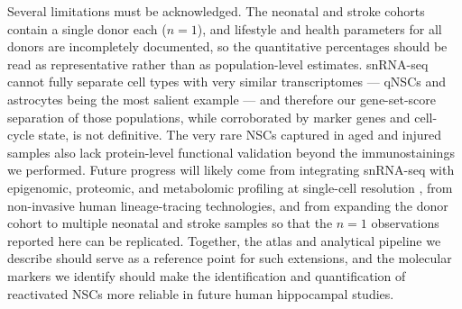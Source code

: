 \documentclass[11pt]{article}
\begin{document}
Several limitations must be acknowledged. The neonatal and stroke cohorts
contain a single donor each ($n=1$), and lifestyle and health parameters
for all donors are incompletely documented, so the quantitative
percentages should be read as representative rather than as
population-level estimates. snRNA-seq cannot fully separate cell types
with very similar transcriptomes --- qNSCs and astrocytes being the most
salient example --- and therefore our gene-set-score separation of those
populations, while corroborated by marker genes and cell-cycle state,
is not definitive. The very rare NSCs captured in aged and injured
samples also lack protein-level functional validation beyond the
immunostainings we performed. Future progress will likely come from
integrating snRNA-seq with epigenomic, proteomic, and metabolomic
profiling at single-cell resolution \cite{ayhan2021resolving,habib2017massively},
from non-invasive human lineage-tracing technologies, and from expanding
the donor cohort to multiple neonatal and stroke samples so that the
$n=1$ observations reported here can be replicated. Together, the atlas
and analytical pipeline we describe should serve as a reference point
for such extensions, and the molecular markers we identify should make
the identification and quantification of reactivated NSCs more reliable
in future human hippocampal studies.



\end{document}
